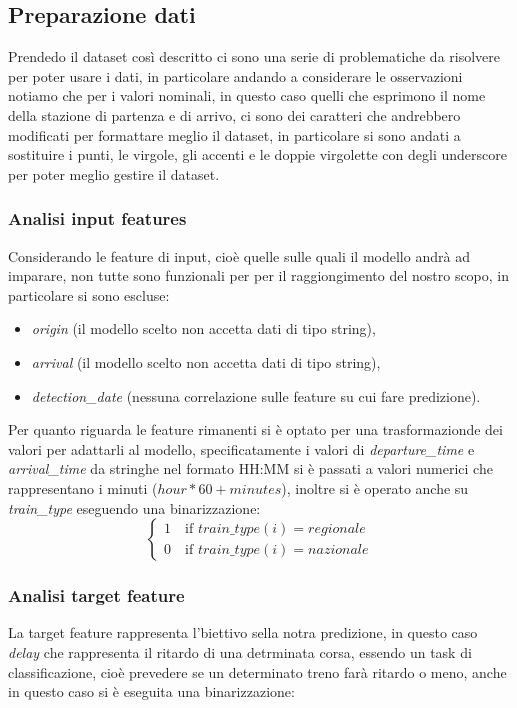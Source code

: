 \documentclass[italian,12pt,a4paper]{article}
\begin{document}
	\subsection{Preparazione dati}
		Prendedo il dataset così descritto ci sono una serie di problematiche da risolvere per poter usare i dati, in particolare andando a considerare le osservazioni notiamo che per i valori nominali, in questo caso quelli che esprimono il nome della stazione di partenza e di arrivo, ci sono dei caratteri che andrebbero modificati per formattare meglio il dataset, in particolare si sono andati a sostituire i punti, le virgole, gli accenti e le doppie virgolette con degli underscore per poter meglio gestire il dataset.
		
		\subsubsection{Analisi input features}
			Considerando le feature di input, cioè quelle sulle quali il modello andrà ad imparare, non tutte sono funzionali per per il raggiongimento del nostro scopo, in particolare si sono escluse:
			
			\begin{itemize}
				\item \textit{origin} (il modello scelto non accetta dati di tipo string),
				\item \textit{arrival} (il modello scelto non accetta dati di tipo string),
				\item \textit{detection\_date} (nessuna correlazione sulle feature su cui fare predizione).
			\end{itemize}
			Per quanto riguarda le feature rimanenti si è optato per una trasformazionde dei valori per adattarli al modello, specificatamente i valori di \textit{departure\_time} e \textit{arrival\_time} da stringhe nel formato HH:MM si è passati a valori numerici che rappresentano i minuti ($hour*60+minutes$), inoltre si è operato anche su \textit{train\_type} eseguendo una binarizzazione:
			\begin{equation*}
				\begin{cases}
					1 \quad \text{if } train\_type(i) = regionale \\
					0 \quad \text{if } train\_type(i) = nazionale
				\end{cases}
			\end{equation*}
			
		\subsubsection{Analisi target feature}
			La target feature rappresenta l'biettivo sella notra predizione, in questo caso \textit{delay} che rappresenta il ritardo di una detrminata corsa, essendo un task di classificazione, cioè prevedere se un determinato treno farà ritardo o meno, anche in questo caso si è eseguita una binarizzazione:
			
\end{document}
